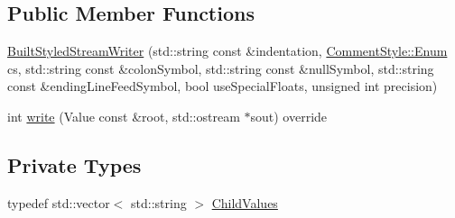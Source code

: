 \subsection*{Public Member Functions}
\begin{DoxyCompactItemize}
\item 
\hyperlink{struct_json_1_1_built_styled_stream_writer_ab0c2e665c86b22f8fafb0e52c8069954}{Built\+Styled\+Stream\+Writer} (std\+::string const \&indentation, \hyperlink{struct_json_1_1_comment_style_a51fc08f3518fd81eba12f340d19a3d0c}{Comment\+Style\+::\+Enum} cs, std\+::string const \&colon\+Symbol, std\+::string const \&null\+Symbol, std\+::string const \&ending\+Line\+Feed\+Symbol, bool use\+Special\+Floats, unsigned int precision)
\item 
int \hyperlink{struct_json_1_1_built_styled_stream_writer_a2ecffc3d66c4feddf208e5cd3b1c0f18}{write} (Value const \&root, std\+::ostream $\ast$sout) override
\end{DoxyCompactItemize}
\subsection*{Private Types}
\begin{DoxyCompactItemize}
\item 
typedef std\+::vector$<$ std\+::string $>$ \hyperlink{struct_json_1_1_built_styled_stream_writer_a8356597862a354bcd55a7cb6e0512899}{Child\+Values}
\end{DoxyCompactItemize}
